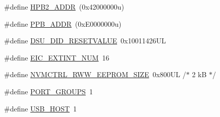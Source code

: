 \begin{DoxyCompactItemize}
\item 
\#define \mbox{\hyperlink{group___s_a_m_d21_e16_b__definitions_gaef42fa53ddf169a2a50be70d29f73571}{H\+P\+B2\+\_\+\+A\+D\+DR}}~(0x42000000u)
\item 
\#define \mbox{\hyperlink{group___s_a_m_d21_e16_b__definitions_ga8895d0a3a9a3126cc44330f86c8ce564}{P\+P\+B\+\_\+\+A\+D\+DR}}~(0x\+E0000000u)
\item 
\#define \mbox{\hyperlink{group___s_a_m_d21_e16_b__definitions_gada75131d542c9e1966238f5488f89bd6}{D\+S\+U\+\_\+\+D\+I\+D\+\_\+\+R\+E\+S\+E\+T\+V\+A\+L\+UE}}~0x10011426\+UL
\item 
\#define \mbox{\hyperlink{group___s_a_m_d21_e16_b__definitions_ga88ebc38c95506296f5d21f82476296ae}{E\+I\+C\+\_\+\+E\+X\+T\+I\+N\+T\+\_\+\+N\+UM}}~16
\item 
\#define \mbox{\hyperlink{group___s_a_m_d21_e16_b__definitions_gacb7a115808eeb0b50bd55888f9ba65ae}{N\+V\+M\+C\+T\+R\+L\+\_\+\+R\+W\+W\+\_\+\+E\+E\+P\+R\+O\+M\+\_\+\+S\+I\+ZE}}~0x800\+U\+L /$\ast$ 2 k\+B $\ast$/
\item 
\#define \mbox{\hyperlink{group___s_a_m_d21_e16_b__definitions_gab9243ffe03a1dc631b57a495b4b3d467}{P\+O\+R\+T\+\_\+\+G\+R\+O\+U\+PS}}~1
\item 
\#define \mbox{\hyperlink{group___s_a_m_d21_e16_b__definitions_ga856aa08fb33114928cbc8635be1792e4}{U\+S\+B\+\_\+\+H\+O\+ST}}~1
\end{DoxyCompactItemize}
